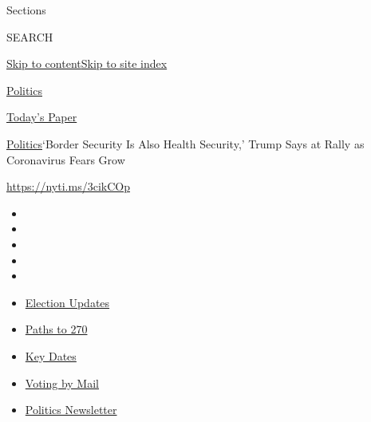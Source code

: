 Sections

SEARCH

\protect\hyperlink{site-content}{Skip to
content}\protect\hyperlink{site-index}{Skip to site index}

\href{https://www.nytimes3xbfgragh.onion/section/politics}{Politics}

\href{https://myaccount.nytimes3xbfgragh.onion/auth/login?response_type=cookie\&client_id=vi}{}

\href{https://www.nytimes3xbfgragh.onion/section/todayspaper}{Today's
Paper}

\href{/section/politics}{Politics}\textbar{}`Border Security Is Also
Health Security,' Trump Says at Rally as Coronavirus Fears Grow

\url{https://nyti.ms/3cikCOp}

\begin{itemize}
\item
\item
\item
\item
\item
\end{itemize}

\begin{itemize}
\item
  \href{https://www.nytimes3xbfgragh.onion/live/2020/09/11/us/trump-vs-biden?action=click\&pgtype=Article\&state=default\&region=TOP_BANNER\&context=storylines_menu}{Election
  Updates}
\item
  \href{https://www.nytimes3xbfgragh.onion/interactive/2020/us/elections/election-states-biden-trump.html?action=click\&pgtype=Article\&state=default\&region=TOP_BANNER\&context=storylines_menu}{Paths
  to 270}
\item
  \href{https://www.nytimes3xbfgragh.onion/interactive/2019/us/elections/2020-presidential-election-calendar.html?action=click\&pgtype=Article\&state=default\&region=TOP_BANNER\&context=storylines_menu}{Key
  Dates}
\item
  \href{https://www.nytimes3xbfgragh.onion/interactive/2020/08/31/us/politics/vote-by-mail-deadlines.html?action=click\&pgtype=Article\&state=default\&region=TOP_BANNER\&context=storylines_menu}{Voting
  by Mail}
\item
  \href{https://www.nytimes3xbfgragh.onion/newsletters/politics?action=click\&pgtype=Article\&state=default\&region=TOP_BANNER\&context=storylines_menu}{Politics
  Newsletter}
\end{itemize}

